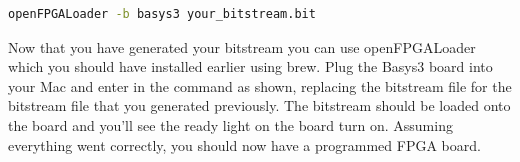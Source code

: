 
\begin{lstlisting}[language=bash]
    openFPGALoader -b basys3 your_bitstream.bit
\end{lstlisting}

Now that you have generated your bitstream you can use openFPGALoader which you should have installed earlier using brew. 
Plug the Basys3 board into your Mac and enter in the command as shown, replacing the bitstream file for the bitstream file that you generated previously.
The bitstream should be loaded onto the board and you'll see the ready light on the board turn on. 
Assuming everything went correctly, you should now have a programmed FPGA board.